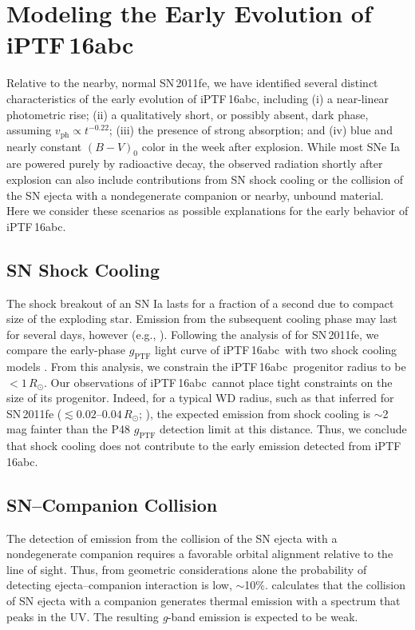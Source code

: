 \documentclass[twocolumn]{aastex61}
\newcommand{\sr}{R_\odot}
\newcommand{\abc}{iPTF\,16abc}
\begin{document}
\section{Modeling the Early Evolution of \abc} \label{sec:lc_energy}

Relative to the nearby, normal SN\,2011fe, we have identified several
distinct characteristics of the early evolution of \abc, including (i) a
near-linear photometric rise; (ii) a qualitatively short, or possibly
absent, dark phase, assuming $v_\mathrm{ph} \propto t^{-0.22}$; (iii) the
presence of strong  absorption; and (iv) blue and nearly constant
$(B - V)_0$ color in the week after explosion. While most SNe Ia are powered
purely by radioactive decay, the observed radiation shortly after explosion
can also include contributions from SN shock cooling or the collision of the
SN ejecta with a nondegenerate companion or nearby, unbound material. Here
we consider these scenarios as possible explanations for the early behavior
of \abc.

\subsection{SN Shock Cooling}

The shock breakout of an SN Ia lasts for a fraction of a second due to compact
size of the exploding star. Emission from the subsequent cooling phase may
last for several days, however (e.g., \citealt{2010ApJ...708..598P}).
Following the analysis of \citet{2012ApJ...744L..17B} for SN\,2011fe, we
compare the early-phase $g_\mathrm{PTF}$ light curve of \abc\ with two shock
cooling models \citep{2010ApJ...708..598P, 2011ApJ...728...63R}. From this
analysis, we constrain the \abc\ progenitor radius to be $<1\,\sr$. Our
observations of \abc\ cannot place tight constraints on the size of its
progenitor. Indeed, for a typical WD radius, such as that inferred for
SN\,2011fe ($\lesssim 0.02$--$0.04\,\sr$; \citealt{2012ApJ...744L..17B,
2014ApJ...784...85P}), the expected emission from shock cooling is
$\sim$2\,mag fainter than the P48 $g_\mathrm{PTF}$ detection limit at this
distance. Thus, we conclude that shock cooling does not contribute to the
early emission detected from \abc.

\subsection{SN--Companion Collision}
\label{sec:companion}

The detection of emission from the collision of the SN ejecta with a
nondegenerate companion requires a favorable orbital alignment relative to
the line of sight. Thus, from geometric considerations alone the probability
of detecting ejecta--companion interaction is low, $\sim$10\%.
\citet{2010ApJ...708.1025K} calculates that the collision of SN ejecta with
a companion generates thermal emission with a spectrum that peaks in the UV.
The resulting \textit{g}-band emission is expected to be weak.
\end{document}
